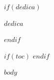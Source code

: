 \documentclass[
$if(fontsize)$
  $fontsize$,
$else$
  11pt,
$endif$
  twoside
]{article}
\makeatletter
\def\cleardoublepage{\clearpage\if@twoside
  \ifodd\c@page\else
    \hbox{}\thispagestyle{empty}\newpage
    \if@twocolumn\hbox{}\newpage\fi
  \fi
\fi}
\makeatother
\begin{document}
$if(dedica)$
\thispagestyle{empty}
\begin{flushright}
\vspace*{5cm}
{\large\itshape\color{Dark}$dedica$\par}
\end{flushright}
\cleardoublepage
$endif$

$if(toc)$
{
\hypersetup{linkcolor=Dark}
\tableofcontents
}
\cleardoublepage
$endif$


$body$
\end{document}
